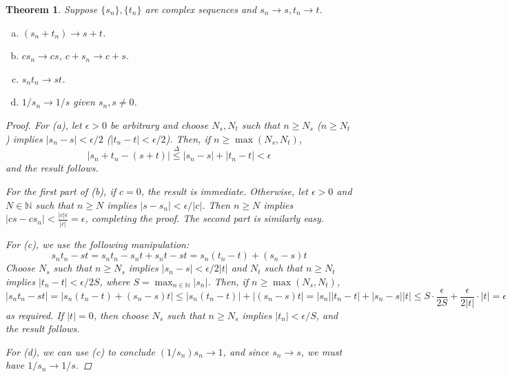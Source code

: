 \documentclass{scrbook}
\newcommand{\N}{\mathbb{N}}
\renewcommand{\to}{\rightarrow}
\newtheorem{theorem}{Theorem}
\begin{document}
\begin{theorem} %
Suppose $\{s_n\}, \{t_n\}$ are complex sequences and $s_n \to s, t_n \to t$.
\begin{enumerate}[(a)]
\item $(s_n + t_n) \to s + t$.
\item $cs_n \to cs$, $c + s_n \to c + s$.
\item $s_nt_n \to st$.
\item $1/s_n \to 1/s$ given $s_n, s \ne 0$.
\end{enumerate}

\begin{proof}
For (a), let $\epsilon > 0$ be arbitrary and choose $N_s, N_t$ such that $n \ge N_s$ ($n \ge N_t$) implies $|s_n - s| < \epsilon/2$ ($|t_n - t| < \epsilon/2$). Then, if $n \ge \max(N_s, N_t)$,
\[
	|s_n + t_n - (s + t)| \overset{\Delta}{\le} |s_n - s| + |t_n - t| < \epsilon
\]
and the result follows.

For the first part of (b), if $c = 0$, the result is immediate. Otherwise, let $\epsilon > 0$ and $N \in \N$ such that $n \ge N$ implies $|s - s_n| < \epsilon/|c|$. Then $n \ge N$ implies $|cs - cs_n| < \frac{|c| \epsilon}{|c|} = \epsilon$, completing the proof. The second part is similarly easy.

For (c), we use the following manipulation:
\[
	s_nt_n - st = s_nt_n - s_nt + s_nt - st = s_n(t_n - t) + (s_n - s)t
\]
Choose $N_s$ such that $n \ge N_s$ implies $|s_n - s| < \epsilon/2|t|$ and $N_t$ such that $n \ge N_t$ implies $|t_n - t| < \epsilon/2S$, where $S = \max_{n\in\N} |s_n|$. Then, if $n \ge \max(N_s, N_t)$, 
\[
	|s_nt_n - st| = |s_n(t_n - t) + (s_n - s)t| \le |s_n(t_n - t)| + |(s_n - s)t| = |s_n||t_n - t| + |s_n - s||t| \le S \cdot \frac{\epsilon}{2S} + \frac{\epsilon}{2|t|} \cdot |t| = \epsilon
\]
as required. If $|t| = 0$, then choose $N_s$ such that $n \ge N_s$ implies $|t_n| < \epsilon / S$, and the result follows.

For (d), we can use (c) to conclude $(1/s_n) s_n \to 1$, and since $s_n \to s$, we must have $1/s_n \to 1/s$.
\end{proof}
\end{theorem}
\end{document}
